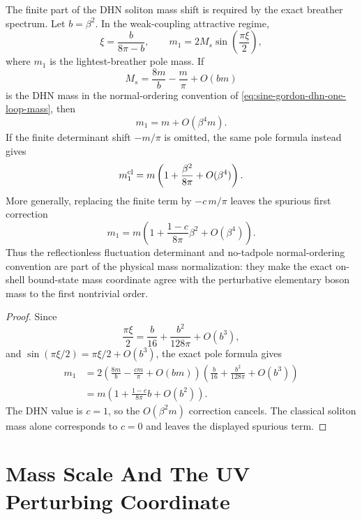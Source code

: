 \begin{proposition}
\label{prop:sine-gordon-dhn-breather-mass-consistency}
The finite part of the DHN soliton mass shift is required by the exact
breather spectrum.  Let \(b=\beta^2\).  In the weak-coupling attractive
regime,
\[
  \xi=\frac{b}{8\pi-b},
  \qquad
  m_1=2M_s\sin\!\left(\frac{\pi\xi}{2}\right),
\]
where \(m_1\) is the lightest-breather pole mass.  If
\[
  M_s=\frac{8m}{b}-\frac{m}{\pi}+O(bm)
\]
is the DHN mass in the normal-ordering convention of
\eqref{eq:sine-gordon-dhn-one-loop-mass}, then
\[
  m_1=m+O(\beta^4m).
\]
If the finite determinant shift \(-m/\pi\) is omitted, the same pole formula
instead gives
\[
  m_1^{\rm cl}
  =
  m\left(1+\frac{\beta^2}{8\pi}+O(\beta^4)\right).
\]
More generally, replacing the finite term by \(-c\,m/\pi\) leaves the
spurious first correction
\[
  m_1
  =
  m\left(1+\frac{1-c}{8\pi}\beta^2+O(\beta^4)\right).
\]
Thus the reflectionless fluctuation determinant and no-tadpole
normal-ordering convention are part of the physical mass normalization: they
make the exact on-shell bound-state mass coordinate agree with the
perturbative elementary boson mass to the first nontrivial order.
\end{proposition}

\begin{proof}
Since
\[
  \frac{\pi\xi}{2}
  =
  \frac{b}{16}+\frac{b^2}{128\pi}+O(b^3),
\]
and \(\sin(\pi\xi/2)=\pi\xi/2+O(b^3)\), the exact pole formula gives
\[
\begin{aligned}
  m_1
  &=
  2\left(\frac{8m}{b}-\frac{cm}{\pi}+O(bm)\right)
  \left(\frac{b}{16}+\frac{b^2}{128\pi}+O(b^3)\right)  \\
  &=
  m\left(1+\frac{1-c}{8\pi}b+O(b^2)\right).
\end{aligned}
\]
The DHN value is \(c=1\), so the \(O(\beta^2m)\) correction cancels.  The
classical soliton mass alone corresponds to \(c=0\) and leaves the displayed
spurious term.
\end{proof}

\section{Mass Scale And The UV Perturbing Coordinate}

